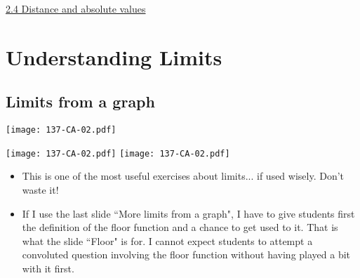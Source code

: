 \documentclass[11pt]{article}
\newcommand{\n}{\newpage}
\newcommand{\nl}{\hfill \vspace{-1.1\baselineskip}} %
\newcommand{\viv}{\hspace{8mm} \href{https://www.youtube.com/watch?v=6wFC38rVMbk&list=PLlwePzQY_wW8P_I8BFgm0-upywEwTKd8_&index=4}{2.4 Distance and absolute values}}
\begin{document}
\begin{videos}
\viv
\end{videos}

\n
\newpage
\section{Understanding Limits}
\subsection{Limits from a graph} 

\begin{center}
{ \texttt{[image: 137-CA-02.pdf]}}

{ \texttt{[image: 137-CA-02.pdf]}}
\quad
{ \texttt{[image: 137-CA-02.pdf]}}
\end{center}

\begin{warning}
\nl
	\begin{itemize}
		\item This is one of the most useful exercises about limits... if used wisely.  Don't waste it!

		\item If I use the last slide ``More limits from a graph", I have to give students first the definition of the floor function and a chance to get used to it.  That is what the slide ``Floor" is for. I cannot expect students to attempt a convoluted question involving the floor function without having played a bit with it first.
	\end{itemize}
\end{warning}
\end{document}
